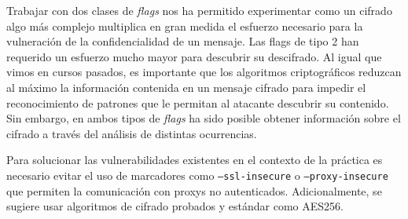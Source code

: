 \documentclass[]{article}
\begin{document}
Trabajar con dos clases de \textit{flags} nos ha permitido experimentar como un cifrado algo más complejo multiplica en gran medida el esfuerzo necesario para la vulneración de la confidencialidad de un mensaje. Las flags de tipo 2 han requerido un esfuerzo mucho mayor para descubrir su descifrado. Al igual que vimos en cursos pasados, es importante que los algoritmos criptográficos reduzcan al máximo la información contenida en un mensaje cifrado para impedir el reconocimiento de patrones que le permitan al atacante descubrir su contenido. Sin embargo, en ambos tipos de \textit{flags} ha sido posible obtener información sobre el cifrado a través del análisis de distintas ocurrencias.

Para solucionar las vulnerabilidades existentes en el contexto de la práctica es necesario evitar el uso de marcadores como \texttt{--ssl-insecure} o \texttt{--proxy-insecure} que permiten la comunicación con proxys no autenticados. Adicionalmente, se sugiere usar algoritmos de cifrado probados y estándar como AES256.
\end{document}
